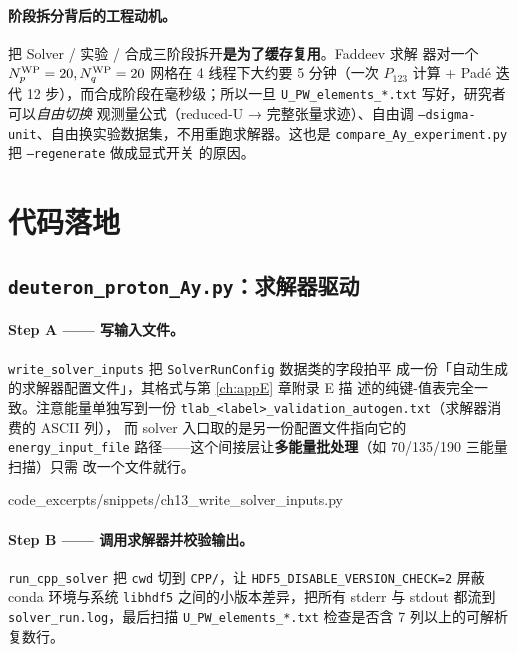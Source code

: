 \paragraph{阶段拆分背后的工程动机。}
把 Solver / 实验 / 合成三阶段拆开\textbf{是为了缓存复用}。Faddeev 求解
器对一个 \({N_{p}^{\text{WP}}}=20, {N_{q}^{\text{WP}}}=20\) 网格在 4 线程下大约要 5 分钟（一次
\(P_{123}\) 计算 + Padé 迭代 12 步），而合成阶段在毫秒级；所以一旦
\texttt{U\_PW\_elements\_*.txt} 写好，研究者可以\emph{自由切换}
观测量公式（reduced-U → 完整张量求迹）、自由调
\texttt{--dsigma-unit}、自由换实验数据集，不用重跑求解器。这也是
\texttt{compare\_Ay\_experiment.py} 把 \texttt{--regenerate} 做成显式开关
的原因。

\section{代码落地}
\label{sec:ch13-code}

\subsection{\texttt{deuteron\_proton\_Ay.py}：求解器驱动}
\label{subsec:ch13-code-driver}

\paragraph{Step A —— 写输入文件。}
\texttt{write\_solver\_inputs} 把 \texttt{SolverRunConfig} 数据类的字段拍平
成一份「自动生成的求解器配置文件」，其格式与第 \ref{ch:appE} 章附录 E 描
述的纯键-值表完全一致。注意能量单独写到一份
\texttt{tlab\_<label>\_validation\_autogen.txt}（求解器消费的 ASCII 列），
而 solver 入口取的是另一份配置文件指向它的 \texttt{energy\_input\_file}
路径——这个间接层让\textbf{多能量批处理}（如 70/135/190 三能量扫描）只需
改一个文件就行。


  {code_excerpts/snippets/ch13_write_solver_inputs.py}

\paragraph{Step B —— 调用求解器并校验输出。}
\texttt{run\_cpp\_solver} 把 \texttt{cwd} 切到 \texttt{CPP/}，让
\texttt{HDF5\_DISABLE\_VERSION\_CHECK=2} 屏蔽 conda 环境与系统
\texttt{libhdf5} 之间的小版本差异，把所有 stderr 与 stdout 都流到
\texttt{solver\_run.log}，最后扫描
\texttt{U\_PW\_elements\_*.txt} 检查是否含 7 列以上的可解析复数行。

